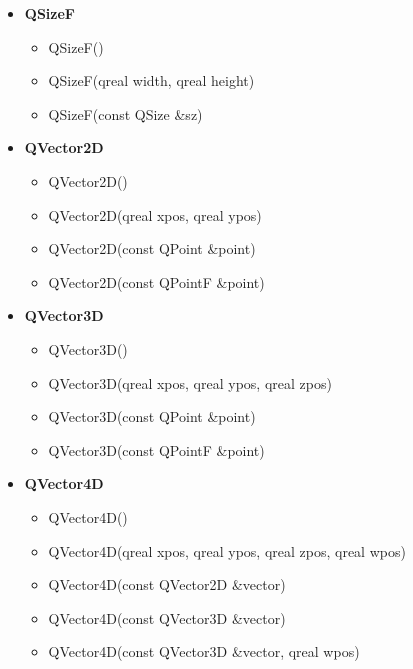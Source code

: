 \documentclass{report}
\begin{document}
\begin{itemize}
\begin{itemize}
        \end{itemize}
    \item \textbf{QSizeF}
        \begin{itemize}
            \item QSizeF()
            \item QSizeF(qreal width, qreal height)
            \item QSizeF(const QSize \&sz)
        \end{itemize}
    \item \textbf{QVector2D}
        \begin{itemize}
            \item QVector2D()
            \item QVector2D(qreal xpos, qreal ypos)
            \item QVector2D(const QPoint \&point)
            \item QVector2D(const QPointF \&point)
        \end{itemize}
    \item \textbf{QVector3D}
        \begin{itemize}
            \item QVector3D()
            \item QVector3D(qreal xpos, qreal ypos, qreal zpos)
            \item QVector3D(const QPoint \&point)
            \item QVector3D(const QPointF \&point)
        \end{itemize}
    \item \textbf{QVector4D}
        \begin{itemize}
            \item QVector4D()
            \item QVector4D(qreal xpos, qreal ypos, qreal zpos, qreal wpos)
            \item QVector4D(const QVector2D \&vector)
            \item QVector4D(const QVector3D \&vector)
            \item QVector4D(const QVector3D \&vector, qreal wpos)
        \end{itemize}
    \end{itemize}

    \bigbreak \noindent 
\end{document}
